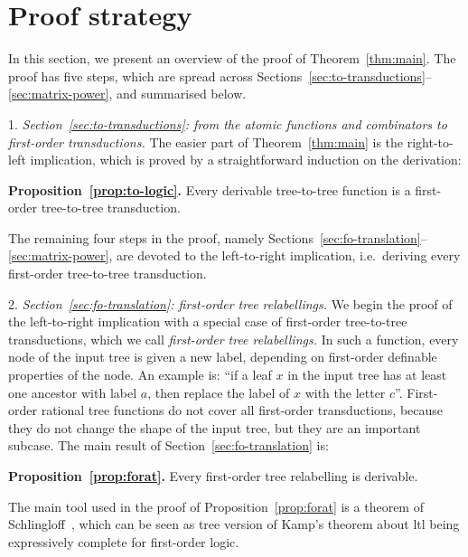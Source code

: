 \section{Proof strategy}
\label{sec:strategy}
In this section, we present an overview of the proof of Theorem~\ref{thm:main}. The proof has five steps, which are spread across Sections~\ref{sec:to-transductions}--\ref{sec:matrix-power}, and summarised below.

\newcommand{\announce}[2]{
\begin{center}
    {\bf #1.} #2
\end{center}
}

1. \emph{Section~\ref{sec:to-transductions}: from the atomic functions and combinators to first-order transductions.} The easier part of Theorem~\ref{thm:main} is the  right-to-left implication, which is proved by a straightforward induction on the derivation:
\announce
{Proposition~\ref{prop:to-logic}}
{Every derivable tree-to-tree function is a first-order tree-to-tree transduction.}
 
 The remaining four steps in the proof, namely Sections~\ref{sec:fo-translation}--\ref{sec:matrix-power}, are devoted to the left-to-right implication, i.e.~deriving every first-order tree-to-tree transduction.

\smallskip
  2. \emph{Section~\ref{sec:fo-translation}: first-order tree relabellings.} We begin the proof of the left-to-right  implication  with a special case of first-order tree-to-tree transductions, which we call \emph{first-order  tree relabellings.} In such a  function, every node of the input tree  is given a new label, depending on first-order definable properties of the node. An example is:  ``if a leaf $x$ in the input tree has at least one ancestor with label $a$, then replace the label of $x$ with the letter $c$''. First-order rational tree functions do not cover all first-order transductions, because they do not change the shape of the input tree, but they are an important subcase.
    The main result of Section~\ref{sec:fo-translation} is:
    \announce
    {Proposition~\ref{prop:forat}}
    {Every first-order tree relabelling is derivable.}
    The main tool used in the proof of Proposition~\ref{prop:forat} is a theorem of Schlingloff~\cite[Theorem 2.6]{schlingloff1992expressive}, which can be seen as tree version of Kamp's theorem about {\sc ltl} being  expressively complete for first-order logic.  
    
